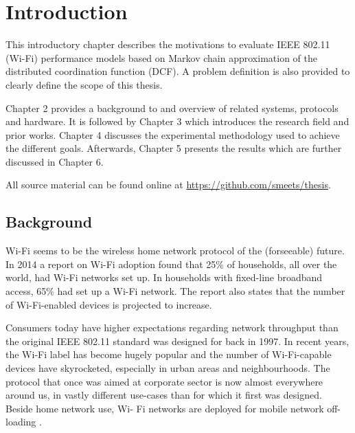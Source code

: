 
\chapter{Introduction}

This introductory chapter describes the motivations to evaluate IEEE 802.11
(Wi-Fi) performance models based on Markov chain approximation of the
distributed coordination function (DCF). A problem definition is also provided
to clearly define the scope of this thesis.

Chapter 2 provides a background to and overview of related systems, protocols
and hardware. It is followed by Chapter 3 which introduces the research field
and prior works. Chapter 4 discusses the experimental methodology used to
achieve the different goals. Afterwards, Chapter 5 presents the results which
are further discussed in Chapter 6.

All source material can be found online at \url{https://github.com/smeets/thesis}.

\section{Background}


Wi-Fi seems to be the wireless home network protocol of the (forseeable)
future. In 2014 a report on Wi-Fi adoption found that 25\% of households, all
over the world, had Wi-Fi networks set up. In households with fixed-line
broadband access, 65\% had set up a Wi-Fi network\cite{smith}. The report also
states that the number of Wi-Fi-enabled devices is projected to increase.

Consumers today have higher expectations regarding network throughput than the
original IEEE 802.11 standard was designed for back in 1997. In recent years,
the Wi-Fi label has become hugely popular and the number of Wi-Fi-capable
devices have skyrocketed, especially in urban areas and neighbourhoods. The
protocol that once was aimed at corporate sector is now almost everywhere
around us, in vastly different use-cases than for which it first was designed.
Beside home network use, Wi- Fi networks are deployed for mobile network
off-loading \cite{offloading}.

